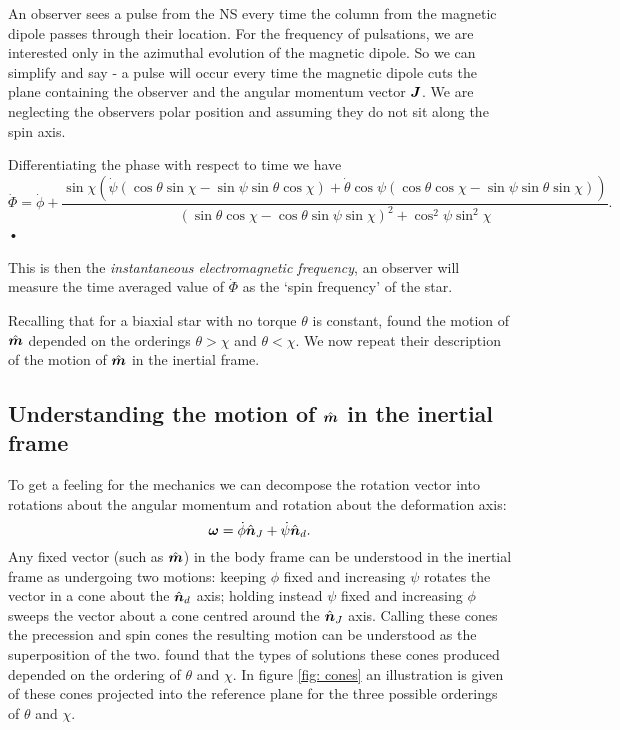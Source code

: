 \documentclass[../full_thesis/full_thesis.tex]{subfiles}
\begin{document}
An observer sees a pulse from the NS every time the column from the magnetic
dipole passes through their location. For the frequency of pulsations, we are
interested only in the azimuthal evolution of the magnetic dipole. So we can
simplify and say - a pulse
will occur every time the magnetic dipole cuts the plane containing the observer
and the angular momentum vector $\boldsymbol{J}$. We are neglecting the observers polar
position and assuming they do not sit along the spin axis.

Differentiating the phase with respect to time we have
\begin{equation}
\dot{\Phi} = \dot{\phi}
+ \frac{\sin\chi \left(
\dot{\psi} (\cos\theta\sin\chi - \sin \psi \sin \theta \cos\chi) +
\dot{\theta} \cos\psi (\cos\theta\cos\chi - \sin \psi \sin \theta \sin\chi)\right)
}{(\sin\theta \cos \chi - \cos \theta \sin \psi \sin \chi)^{2} + \cos^{2}\psi \sin^{2} \chi}.
\label{eqn: Phi_dot}
\end{equation}•

This is then the \emph{instantaneous electromagnetic frequency}, an observer
will measure the time averaged value of $\dot{\Phi}$ as the `spin frequency' of
the star.

Recalling that for a biaxial star with no torque $\theta$ is constant,
\citet{Jones2001} found the motion of $\hat{\boldsymbol{m}}$ depended on the orderings
$\theta > \chi$ and $\theta < \chi$. We now repeat their description of the
motion of $\hat{\boldsymbol{m}}$ in the inertial frame.

\subsection{Understanding the motion of $\hat{\boldsymbol{m}}$ in the inertial frame}
To get a feeling for the mechanics we can decompose the rotation vector into
rotations about the angular momentum and rotation about the deformation axis:
\begin{equation}
  \boldsymbol{\omega} = \dot{\phi}\hat{\boldsymbol{n}}_{J} + \dot{\psi}\hat{\boldsymbol{n}}_{d}.
\label{eqn: decomp}
\end{equation}
Any fixed vector (such as $\hat{\boldsymbol{m}}$) in the body frame can be understood in the
inertial frame as undergoing two motions: keeping $\phi$ fixed and increasing
$\psi$ rotates the vector in a cone about the $\hat{\boldsymbol{n}}_{d}$ axis; holding instead
$\psi$ fixed and increasing $\phi$ sweeps the vector about a cone centred
around the $\hat{\boldsymbol{n}}_{J}$ axis. Calling these cones the precession and spin cones
the resulting motion can be understood as the superposition of the
two. \citet{Jones2001} found that the types of solutions these cones produced
depended on the ordering of $\theta$ and $\chi$. In figure \ref{fig: cones} an
illustration is given of these cones
projected into the reference plane for the three possible orderings of $\theta$
and $\chi$.
\end{document}
